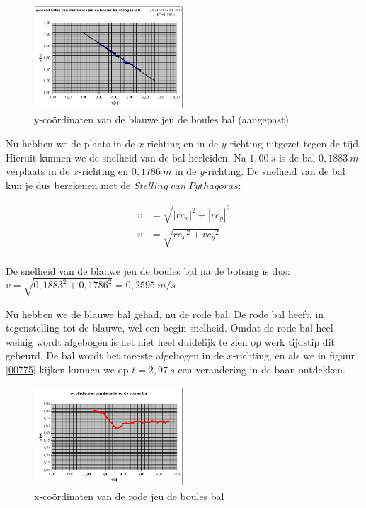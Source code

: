 \documentclass[12pt,a4paper]{article}
\begin{document}
	\begin{figure}[H]
		\centerline{\includegraphics[width=0.5\textwidth]{Plaatjes/00774.png}}
		\caption{y-co\"{o}rdinaten van de blauwe jeu de boules bal (aangepast)}
		\label{00774}
	\end{figure}

	Nu hebben we de plaats in de $x$-richting en in de $y$-richting uitgezet tegen de tijd. Hieruit kunnen we de snelheid van de bal herleiden. Na $1,00\ s$ is de bal $0,1883\ m$ verplaats in de $x$-richting en $0,1786\ m$ in de $y$-richting. De snelheid van de bal kun je dus berekenen met de $Stelling\ van\ Pythagoras$:

	\begin{equation}
		\label{snelheid}
		\begin{aligned}
			v&=\sqrt{{|rc_x|}^2+{|rc_y|}^2}\\
			v&=\sqrt{{rc_x}^2+{rc_y}^2}\\
		\end{aligned}
	\end{equation}

	De snelheid van de blauwe jeu de boules bal na de botsing is dus: $v=\sqrt{{0,1883}^2+{0,1786}^2}=0,2595\ m/s$

	Nu hebben we de blauwe bal gehad, nu de rode bal. De rode bal heeft, in tegenstelling tot de blauwe, wel een begin snelheid. Omdat de rode bal heel weinig wordt afgebogen is het niet heel duidelijk te zien op werk tijdstip dit gebeurd. De bal wordt het meeste afgebogen in de $x$-richting, en als we in figuur \eqref{00775} kijken kunnen we op $t=2,97\ s$ een verandering in de baan ontdekken.

	\begin{figure}[h]
		\centerline{\includegraphics[width=0.5\textwidth]{Plaatjes/00775.png}}
		\caption{x-co\"{o}rdinaten van de rode jeu de boules bal}
		\label{00775}
	\end{figure}
	
\end{document}
